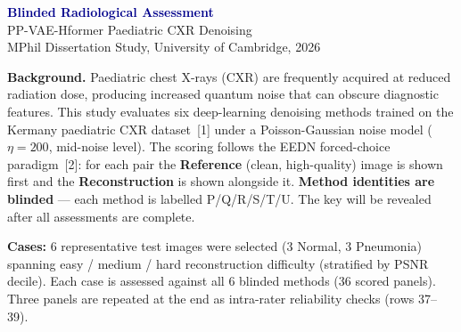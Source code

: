 \documentclass[a4paper,10pt]{article}
\begin{document}
\begin{minipage}[t]{0.28\textwidth}
  \vspace{0pt}
\end{minipage}
\hfill
\begin{minipage}[t]{0.40\textwidth}
  \vspace{0pt}\centering
  {\large\bfseries\textcolor{darkblue}{Blinded Radiological Assessment}}\\[3pt]
  {\small PP-VAE-Hformer Paediatric CXR Denoising}\\[2pt]
  {\footnotesize MPhil Dissertation Study, University of Cambridge, 2026}
\end{minipage}
\hfill
\begin{minipage}[t]{0.24\textwidth}
  \vspace{0pt}\raggedleft
\end{minipage}

\vspace{0.35cm}

{\small
\textbf{Background.}
Paediatric chest X-rays (CXR) are frequently acquired at reduced radiation dose, producing
increased quantum noise that can obscure diagnostic features.
This study evaluates six deep-learning denoising methods trained on the Kermany paediatric
CXR dataset~[1] under a Poisson-Gaussian noise model ($\eta=200$, mid-noise level).
The scoring follows the EEDN forced-choice paradigm~[2]: for each pair the
\textbf{Reference} (clean, high-quality) image is shown first and the \textbf{Reconstruction}
is shown alongside it.
\textbf{Method identities are blinded} — each method is labelled P/Q/R/S/T/U.
The key will be revealed after all assessments are complete.

\textbf{Cases:} 6 representative test images were selected (3 Normal, 3 Pneumonia)
spanning easy / medium / hard reconstruction difficulty (stratified by PSNR decile).
Each case is assessed against all 6 blinded methods (36 scored panels).
Three panels are repeated at the end as intra-rater reliability checks (rows 37--39).
}
\end{document}
